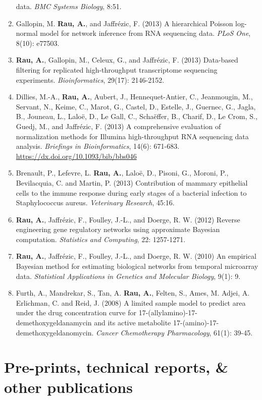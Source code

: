 \documentclass[11pt, a4paper]{awesome-cv}
\begin{document}
\begin{enumerate}
  data. \emph{BMC Systems Biology}, 8:51.
\item
  Gallopin, M. \textbf{Rau, A.}, and Jaffrézic, F. (2013) A hierarchical
  Poisson log-normal model for network inference from RNA sequencing
  data. \emph{PLoS One}, 8(10): e77503.
\item
  \textbf{Rau, A.}, Gallopin, M., Celeux, G., and Jaffrézic, F. (2013)
  Data-based filtering for replicated high-throughput transcriptome
  sequencing experiments. \emph{Bioinformatics}, 29(17): 2146-2152.
\item
  Dillies, M.-A., \textbf{Rau, A.}, Aubert, J., Hennequet-Antier, C.,
  Jeanmougin, M., Servant, N., Keime, C., Marot, G., Castel, D.,
  Estelle, J., Guernec, G., Jagla, B., Jouneau, L., Laloë, D., Le Gall,
  C., Schaëffer, B., Charif, D., Le Crom, S., Guedj, M., and Jaffrézic,
  F. (2013) A comprehensive evaluation of normalization methods for
  Illumina high-throughput RNA sequencing data analysis. \emph{Briefings
  in Bioinformatics}, 14(6): 671-683.
  \url{https://dx.doi.org/10.1093/bib/bbs046}
\item
  Brenault, P., Lefevre, L. \textbf{Rau, A.}, Laloë, D., Pisoni, G.,
  Moroni, P., Bevilacquia, C. and Martin, P. (2013) Contribution of
  mammary epithelial cells to the immune response during early stages of
  a bacterial infection to Staphylococcus aureus. \emph{Veterinary
  Research}, 45:16.
\item
  \textbf{Rau, A.}, Jaffrézic, F., Foulley, J.-L., and Doerge, R. W.
  (2012) Reverse engineering gene regulatory networks using approximate
  Bayesian computation. \emph{Statistics and Computing}, 22: 1257-1271.
\item
  \textbf{Rau, A.}, Jaffrézic, F., Foulley, J.-L., and Doerge, R. W.
  (2010) An empirical Bayesian method for estimating biological networks
  from temporal microarray data. \emph{Statistical Applications in
  Genetics and Molecular Biology}, 9(1): 9.
\item
  Furth, A., Mandrekar, S., Tan, A. \textbf{Rau, A.}, Felten, S., Ames,
  M. Adjei, A. Erlichman, C. and Reid, J. (2008) A limited sample model
  to predict area under the drug concentration curve for
  17-(allylamino)-17-demethoxygeldanamycin and its active metabolite
  17-(amino)-17-demethoxygeldanomycin. \emph{Cancer Chemotherapy
  Pharmacology}, 61(1): 39-45.
\end{enumerate}

\hypertarget{pre-prints-technical-reports-other-publications}{%
\section{Pre-prints, technical reports, \& other
publications}\label{pre-prints-technical-reports-other-publications}}
\end{document}
